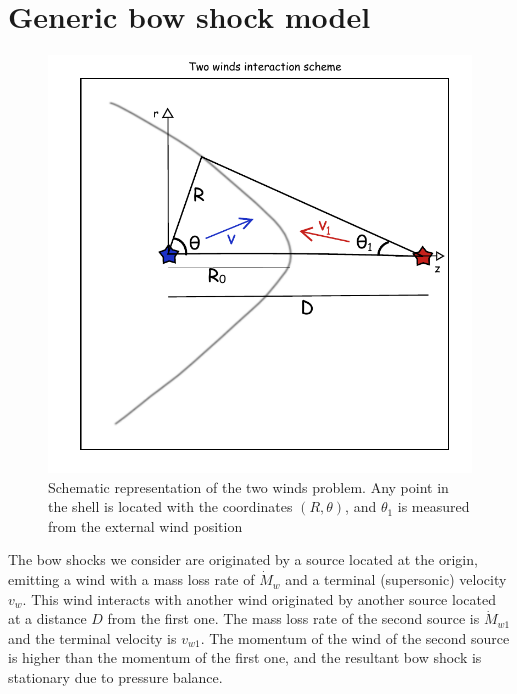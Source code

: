 \section{Generic bow shock model}
\label{sec:generic-model}

\begin{figure}
\includegraphics[width=\linewidth]{2winds-scheme}
\caption{Schematic representation of the two winds problem. Any point in the shell is located with the coordinates
$(R,\theta)$, and $\theta_1$ is measured from the external wind position}
\label{fig:2-winds}
\end{figure}

The bow shocks we consider are originated by a source located at the origin, emitting a wind with a mass loss rate of $\dot{M}_w$ and a terminal
(supersonic) velocity $v_w$. This wind interacts with another wind originated by another source located at a distance $D$ from the first one. 
The mass loss rate of the second source is $\dot{M}_{w1}$ and the terminal velocity is $v_{w1}$. The momentum of the wind of the second source is
higher than the momentum of the first one, and the resultant bow shock is stationary due to pressure balance.
